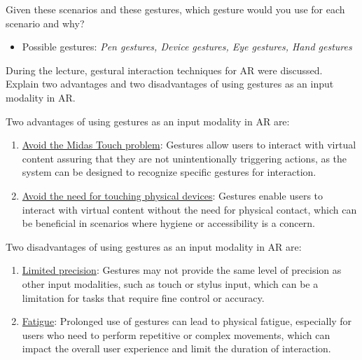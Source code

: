 \begin{ejercicio}
    Given these scenarios and these gestures, which gesture would you use for each scenario and why?
    \begin{itemize}
        \item Possible gestures: \textit{Pen gestures, Device gestures, Eye gestures, Hand gestures}
    \end{itemize}
\end{ejercicio}

\begin{ejercicio}
    During the lecture, gestural interaction techniques for AR were discussed. Explain two advantages and two disadvantages of using gestures as an input modality in AR.

    Two advantages of using gestures as an input modality in AR are:
    \begin{enumerate}
        \item \ul{Avoid the Midas Touch problem}: Gestures allow users to interact with virtual content assuring that they are not unintentionally triggering actions, as the system can be designed to recognize specific gestures for interaction.
        \item \ul{Avoid the need for touching physical devices}: Gestures enable users to interact with virtual content without the need for physical contact, which can be beneficial in scenarios where hygiene or accessibility is a concern.
    \end{enumerate}

    Two disadvantages of using gestures as an input modality in AR are:
    \begin{enumerate}
        \item \ul{Limited precision}: Gestures may not provide the same level of precision as other input modalities, such as touch or stylus input, which can be a limitation for tasks that require fine control or accuracy.
        \item \ul{Fatigue}: Prolonged use of gestures can lead to physical fatigue, especially for users who need to perform repetitive or complex movements, which can impact the overall user experience and limit the duration of interaction.
    \end{enumerate}
\end{ejercicio}


